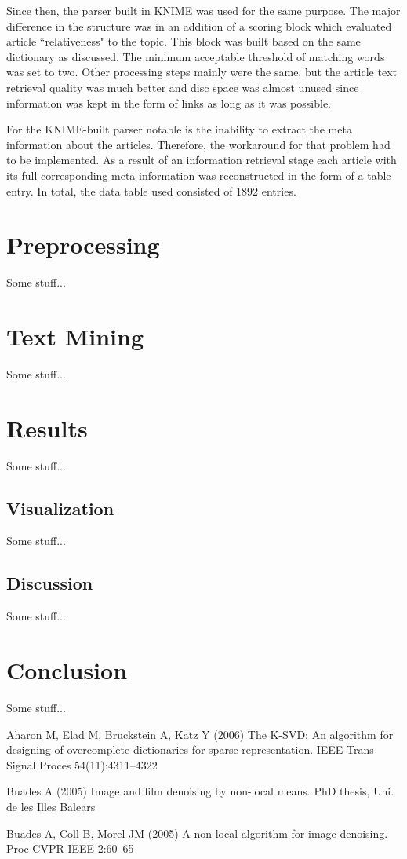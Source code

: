 \documentclass[]{article}
\begin{document}
Since then, the parser built in KNIME was used for the same purpose. The major difference in the structure was in an addition of a scoring block which evaluated article ``relativeness" to the topic. This block was built based on the same dictionary as discussed. The minimum acceptable threshold of matching words was set to two. Other processing steps mainly were the same, but the article text retrieval quality was much better and disc space was almost unused since information was kept in the form of links as long as it was possible. 

For the KNIME-built parser notable is the inability to extract the meta information about the articles. Therefore, the workaround for that problem had to be implemented. As a result of an information retrieval stage each article with its full corresponding meta-information was reconstructed in the form of a table entry. In total, the data table used consisted of 1892 entries.
%
\section{Preprocessing}
%
Some stuff...
%
\section{Text Mining}
%
Some stuff...
%
\section{Results}
%
Some stuff...
% 
\subsection{Visualization}
%
Some stuff...
% 
\subsection{Discussion}
%
Some stuff...
%
\section{Conclusion}
%
Some stuff...
%
%
\begin{thebibliography}{99}
%


Aharon M, Elad M, Bruckstein A, Katz Y (2006)
The K-SVD: An algorithm for designing of overcomplete dictionaries for sparse representation.
IEEE Trans Signal Proces 54(11):4311–4322

Buades A (2005)
Image and film denoising by non-local means. PhD thesis, Uni. de les Illes Balears

Buades A, Coll B, Morel JM (2005)
A non-local algorithm for image denoising.
Proc CVPR IEEE 2:60–65

\end{thebibliography}
\end{document}
